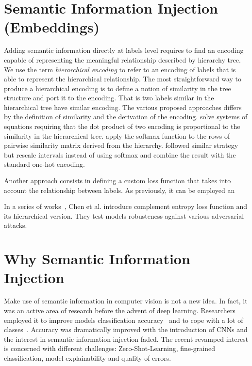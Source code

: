 \section{Semantic Information Injection (Embeddings)}

Adding semantic information directly at labels level requires to find an
encoding capable of representing the meaningful relationship described by
hierarchy tree. We use the term \emph{hierarchical encoding} to refer to
an encoding of labels that is able to represent the hierarchical relationship.
The most straightforward way to produce a hierarchical encoding is to define a
notion of similarity in the tree structure and port it to the encoding. That is
two labels similar in the hierarchical tree have similar encoding. The various
proposed approaches differs by the definition of similarity and the derivation
of the encoding. \cite{HierarchyBasedBarz2018} solve systems of equations
requiring that the dot product of two encoding is proportional to the
similarity in the hierarchical tree. \cite{MakingBetterMBertin2019} apply the
softmax function to the rows of pairwise similarity matrix derived from the
hierarchy. \cite{BeyondOneHotPerott2023} followed similar strategy but
rescale intervals instead of using softmax and combine the result with the
standard one-hot encoding.

Another approach consists in defining a custom loss function that takes into
account the relationship between labels. As previously, it can be employed an

In a series of works~\cite{ComplementObjeChen2019, ImprovingAdverChen2019,
LearningWithHChen2019}, Chen et al. introduce complement entropy loss function
and its hierarchical version. They test models robusteness against various
adversarial attacks.


\section{Why Semantic Information Injection}
\label{sec:why-semantic-information-injection}

Make use of semantic information in computer vision is not a new idea. In fact,
it was an active area of research before the advent of deep learning.
Researchers employed it to improve models classification
accuracy~\cite{ScalableRecognNister2006, SemanticHierarMarsza2007,
ExploitingObjeZweig2007, LearningMultipKrizhe2009} and to cope with a lot of
classes~\cite{WhatDoesClassDeng2010}. Accuracy was dramatically improved with
the introduction of CNNs and the interest in semantic information injection
faded. The recent revamped interest is concerned with different challenges:
Zero-Shot-Learning, fine-grained classification, model explainability and
quality of errors.

